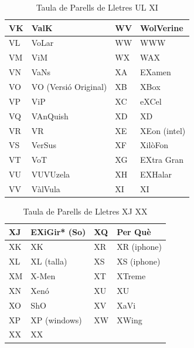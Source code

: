 \begin{table}[ht]
\begin{tabular}{|l|l|l|l|}
        VK & ValK                 & WV & WolVerine         \\ \hline
        VL & VoLar                & WW & WWW               \\ \hline
        VM & ViM                  & WX & WAX               \\ \hline
        VN & VaNs                 & XA & EXamen            \\ \hline
        VO & VO (Versió Original) & XB & XBox              \\ \hline
        VP & ViP                  & XC & eXCel             \\ \hline
        VQ & VAnQuish             & XD & XD                \\ \hline
        VR & VR                   & XE & XEon (intel)      \\ \hline
        VS & VerSus               & XF & XilòFon           \\ \hline
        VT & VoT                  & XG & EXtra Gran        \\ \hline
        VU & VUVUzela             & XH & EXHalar           \\ \hline
        VV & VàlVula              & XI & XI                \\ \hline
    \end{tabular}
    \caption{Taula de Parells de Lletres UL \rightarrow XI}
    \label{tla:lletres-8}
\end{table}

\begin{table}[ht]
    \centering
    \begin{tabular}{|l|l|l|l|}
        \hline
        XJ & EXiGir* (So) & XQ & Per Què     \\ \hline
        XK & XK           & XR & XR (iphone) \\ \hline
        XL & XL (talla)   & XS & XS (iphone) \\ \hline
        XM & X-Men        & XT & XTreme      \\ \hline
        XN & Xenó         & XU & XU          \\ \hline
        XO & ShO          & XV & XaVi        \\ \hline
        XP & XP (windows) & XW & XWing       \\ \hline
        XX & XX           &    &             \\ \hline
    \end{tabular}
    \caption{Taula de Parells de Lletres XJ \rightarrow XX}
    \label{tla:lletres-9}
\end{table}


